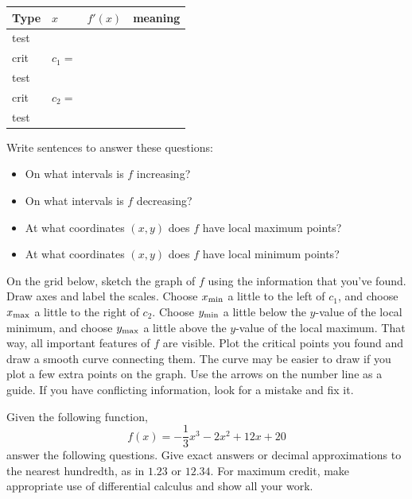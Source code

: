 \begin{ProblemSet}
\begin{Problem}[pencil space=0in]
  \newcommand{\Bx}[1]{\Strut[-0.25in]{0.75in}#1}
  \begin{tabular}{l|p{1in}|p{1in}|p{3in}}
    Type & $x$ & $f'(x)$ & meaning
    \\ \hline
    \Bx{test} & & &
    \\ \hline
    \Bx{crit} & \Bx{$c_1 = $} & &
    \\ \hline
    \Bx{test} & & &
    \\ \hline
    \Bx{crit} & \Bx{$c_2 = $} & &
    \\ \hline
    \Bx{test} & & &
    \\ \hline
  \end{tabular}

 \end{Problem}

 \begin{Problem}[pencil space=2.5in]
  Write sentences to answer these questions:
  \begin{itemize}
  \item On what intervals is $f$ increasing?
  \item On what intervals is $f$ decreasing?
  \item At what coordinates $(x,y)$ does $f$ have local maximum points?
  \item At what coordinates $(x,y)$ does $f$ have local minimum points?
  \end{itemize}
 \end{Problem}

 \begin{Problem}
  On the grid below, sketch the graph of $f$ using the information that you've found.
  Draw axes and label the scales.
  Choose $x_\mathrm{min}$ a little to the left of $c_1$, and choose $x_\mathrm{max}$ a little to the right of $c_2$.
  Choose $y_\mathrm{min}$ a little below the $y$-value of the local minimum, and choose $y_\mathrm{max}$ a little above the $y$-value of the local maximum.
  That way, all important features of $f$ are visible.
  Plot the critical points you found and draw a smooth curve connecting them.
  The curve may be easier to draw if you plot a few extra points on the graph.
  Use the arrows on the number line as a guide.
  If you have conflicting information, look for a mistake and fix it.

  \bigskip
  \GraphingGrid

 \end{Problem}
\end{ProblemSet}

\newpage

Given the following function,
\begin{equation*}
 f(x) = -\frac{1}{3} x^3 - 2 x^2 + 12 x + 20
\end{equation*}
answer the following questions.
Give exact answers or decimal approximations to the nearest hundredth, as in $1.23$ or $12.34$.
For maximum credit, make appropriate use of differential calculus and show all your work.

